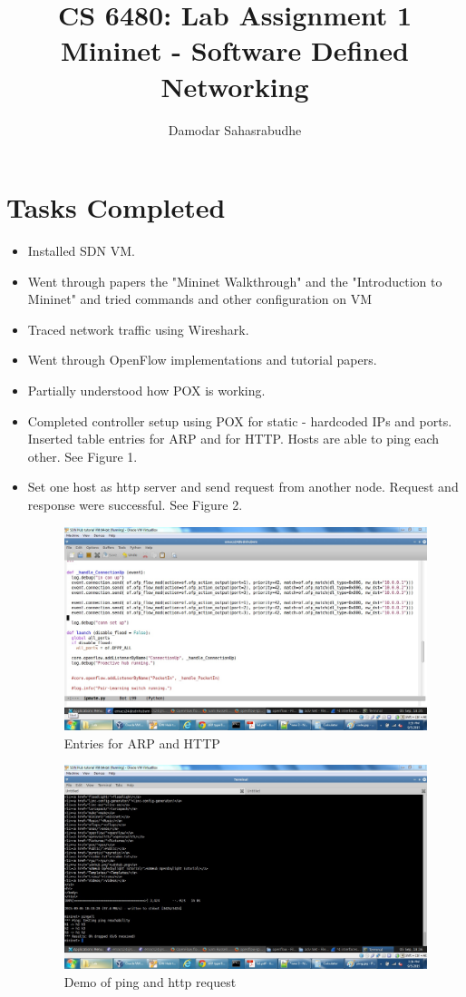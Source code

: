 \documentclass[letterpaper,twocolumn,10pt]{article}
\title{CS 6480: Lab Assignment 1\\
Mininet - Software Defined Networking}
\author{Damodar Sahasrabudhe}
\affil{School of Computing, University of Utah}
\begin{document}
\maketitle

\section{Tasks Completed}
\begin{itemize}
\item Installed SDN VM.
\item Went through papers the "Mininet Walkthrough" and the "Introduction to Mininet" and tried commands and other configuration on VM
\item Traced network traffic using Wireshark.
\item Went through OpenFlow implementations and tutorial papers.
\item Partially understood how POX is working. 
\item Completed controller setup using POX for static - hardcoded IPs and ports. Inserted table entries for ARP and for HTTP. Hosts are able to ping each other. See Figure 1.
\item Set one host as http server and send request from another node. Request and response were successful. See Figure 2.


\begin{figure}[h]
\caption{Entries for ARP and HTTP}
\centering
\includegraphics[width=\textwidth]{code}
\end{figure}

\begin{figure}[h]
\caption{Demo of ping and http request}
\centering
\includegraphics[width=\textwidth]{ping}
\end{figure}



\end{itemize}
\end{document}
